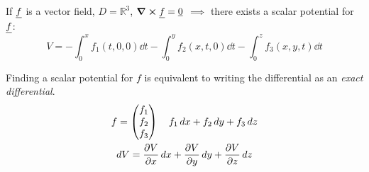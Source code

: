 \documentclass[00_complete]{subfiles}
\begin{document}
If $\underline f$ is a vector field, $D=\mathbb{R}^3$, $\curl \underline f= \underline 0$ $\implies$
there exists a scalar potential for $\underline f$:
$$V=-\int_{0}^{x}f_1(t,0,0)\dd{t}-\int_{0}^{y}f_2(x,t,0)\dd{t}-\int_{0}^{z}f_3(x,y,t)\dd{t}$$
\begin{note}
    Finding a scalar potential for $f$ is equivalent to writing the
    differential as an \emph{exact differential}.
    \begin{gather*}
        f=\begin{pmatrix}
            f_1 \\f_2 \\f_3
        \end{pmatrix} \quad f_1\dd{x}+f_2\dd{y}+f_3\dd{z} \\
        \dd{V} = \pdv{V}{x}\dd{x} + \pdv{V}{y}\dd{y} + \pdv{V}{z}\dd{z}
    \end{gather*}
\end{note}
\end{document}
